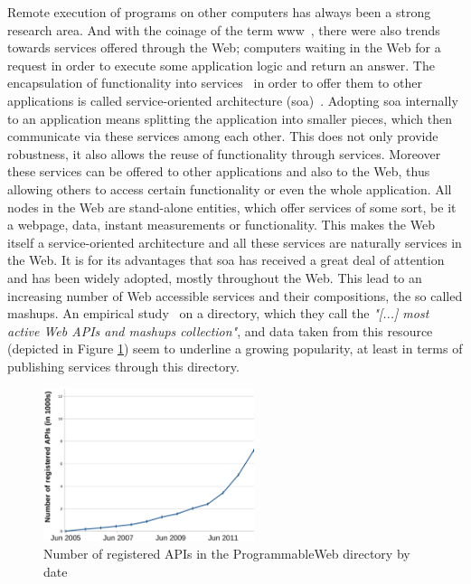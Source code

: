 Remote execution of programs on other computers has always been a strong research area. And with the coinage of the term \textrm{\gls{www}}~\cite{DBLP:journals/en/Berners-LeeCGP92}, there were also trends towards services offered through the Web; computers waiting in the Web for a request in order to execute some application logic and return an answer.
The encapsulation of functionality into services~\cite{peltz2003web} in order to offer them to other applications is called service-oriented architecture (\textrm{\acrshort{soa}})~\cite{perrey2003service}.
Adopting \textrm{\acrshort{soa}} internally to an application means splitting the application into smaller pieces, which then communicate via these services among each other.
This does not only provide robustness, it also allows the reuse of functionality through services.
Moreover these services can be offered to other applications and also to the Web, thus allowing others to access certain functionality or even the whole application.
All nodes in the Web are stand-alone entities, which offer services of some sort, be it a webpage, data, instant measurements or functionality.
This makes the Web itself a service-oriented architecture and all these services are naturally services in the Web.
It is for its advantages that \textrm{\acrshort{soa}} has received a great deal of attention and has been widely adopted, mostly throughout the Web.
This lead to an increasing number of Web accessible services and their compositions, the so called \textrm{\gls{mashup}s}.
An empirical study~\cite{conf/icws/HuangFT12} on a directory, which they call the \textit{"[...] most active Web APIs and mashups collection"}, and data taken from this resource (depicted in Figure \ref{fig:NumOfAPIs}) seem to underline a growing popularity, at least in terms of publishing services through this directory.

\begin{figure}[!ht]
  \centering
  \includegraphics[width=0.55\textwidth]{figures/NumOfAPIs}
  \caption{Number of registered APIs in the ProgrammableWeb directory by date}
  \label{fig:NumOfAPIs}
\end{figure}


